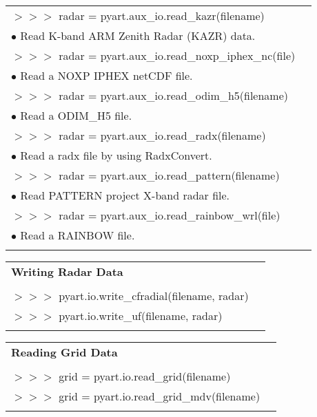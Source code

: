 \documentclass[potrait, z1paper, fontscale=0.33]{baposter} %
\begin{document}
\begin{poster}
{\begin{flushleft}
\begin{tabular}{@{}ll@{}}
$>$$>$$>$ radar = pyart.aux\_io.read\_kazr(filename)\\
\-\hspace{0.4cm} $\bullet$ Read K-band ARM Zenith Radar (KAZR) data.\\
$>$$>$$>$ radar = pyart.aux\_io.read\_noxp\_iphex\_nc(file)\\
\-\hspace{0.4cm} $\bullet$ Read a NOXP IPHEX netCDF file.\\
$>$$>$$>$ radar = pyart.aux\_io.read\_odim\_h5(filename)\\
\-\hspace{0.4cm} $\bullet$ Read a ODIM\_H5 file.\\
$>$$>$$>$ radar = pyart.aux\_io.read\_radx(filename)\\
\-\hspace{0.4cm} $\bullet$ Read a radx file by using RadxConvert.\\
$>$$>$$>$ radar = pyart.aux\_io.read\_pattern(filename)\\
\-\hspace{0.4cm} $\bullet$ Read PATTERN project X-band radar file.\\
$>$$>$$>$ radar = pyart.aux\_io.read\_rainbow\_wrl(file)\\
\-\hspace{0.4cm} $\bullet$ 	Read a RAINBOW file.\\

\\
\end{tabular}

\begin{tabular}{@{}ll@{}}
\multicolumn{2}{l}{\cellcolor[HTML]{DDFFFF}\bf Writing Radar Data} \\
\\
$>$$>$$>$ pyart.io.write\_cfradial(filename, radar)\\
$>$$>$$>$ pyart.io.write\_uf(filename, radar)\\
\\
\end{tabular}

\begin{tabular}{@{}ll@{}}
\multicolumn{2}{l}{\cellcolor[HTML]{DDFFFF}\bf Reading Grid Data} \\
\\
$>$$>$$>$ grid = pyart.io.read\_grid(filename)\\
$>$$>$$>$ grid = pyart.io.read\_grid\_mdv(filename)\\
\\
\end{tabular}


\end{flushleft}}
\end{poster}
\end{document}
